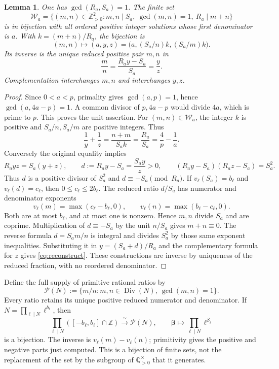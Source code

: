 \documentclass[11pt]{article}
\newtheorem{lemma}[theorem]{Lemma}
\theoremstyle{definition}\newtheorem{definition}[theorem]{Definition}
\theoremstyle{remark}\newtheorem{remark}[theorem]{Remark}
\DeclareMathOperator{\Div}{Div}
\newcommand{\Z}{\mathbb Z}\newcommand{\Q}{\mathbb Q}
\begin{document}
\begin{lemma}\label{lem:units}
One has \(\gcd(R_a,S_a)=1\).  The finite set
\[
 \mathcal W_a=
 \{(m,n)\in\Z_{>0}^2:m,n\mid S_a,\ \gcd(m,n)=1,\
                         R_a\mid m+n\}
\]
is in bijection with all ordered positive integer solutions whose first
denominator is \(a\).  With \(k=(m+n)/R_a\), the bijection is
\begin{equation}\label{eq:reconstruct}
 (m,n)\longmapsto(a,y,z)
       =\bigl(a,(S_a/n)k,(S_a/m)k\bigr).
\end{equation}
Its inverse is the unique reduced positive pair \(m,n\) in
\[
 \frac mn=\frac{R_a y-S_a}{S_a}=\frac yz .
\]
Complementation interchanges \(m,n\) and interchanges \(y,z\).
\end{lemma}
\begin{proof}
Since \(0<a<p\), primality gives \(\gcd(a,p)=1\), hence
\(\gcd(a,4a-p)=1\).  A common divisor of \(p,4a-p\) would divide
\(4a\), which is prime to \(p\).  This proves the unit assertion.
For \((m,n)\in\mathcal W_a\), the integer \(k\) is positive and
\(S_a/n,S_a/m\) are positive integers.  Thus
\[
 \frac1y+\frac1z=\frac{n+m}{S_a k}=\frac{R_a}{S_a}
                   =\frac4p-\frac1a.
\]
Conversely the original equality implies
\[
 R_a yz=S_a(y+z),\qquad
 d:=R_a y-S_a=\frac{S_a y}{z}>0,\qquad
 (R_a y-S_a)(R_a z-S_a)=S_a^2.
\]
Thus \(d\) is a positive divisor of \(S_a^2\) and
\(d\equiv-S_a\pmod{R_a}\).  If \(v_\ell(S_a)=b_\ell\) and
\(v_\ell(d)=c_\ell\), then \(0\le c_\ell\le2b_\ell\).
The reduced ratio \(d/S_a\) has numerator and denominator exponents
\[
 v_\ell(m)=\max(c_\ell-b_\ell,0),\qquad
 v_\ell(n)=\max(b_\ell-c_\ell,0).
\]
Both are at most \(b_\ell\), and at most one is nonzero.  Hence \(m,n\)
divide \(S_a\) and are coprime.  Multiplication of
\(d\equiv-S_a\) by the unit \(n/S_a\) gives \(m+n\equiv0\).
The reverse formula \(d=S_a m/n\) is integral and divides \(S_a^2\)
by those same exponent inequalities.  Substituting it in
\(y=(S_a+d)/R_a\) and the complementary formula for \(z\)
gives \eqref{eq:reconstruct}.  These constructions are inverse by
uniqueness of the reduced fraction, with no reordered denominator.
\end{proof}

Define the full supply of primitive rational ratios by
\[
 \mathcal P(N):=\{m/n:m,n\in\Div(N),\ \gcd(m,n)=1\}.
\]
Every ratio retains its unique positive reduced numerator and
denominator.  If \(N=\prod_{\ell\mid N}\ell^{b_\ell}\), then
\begin{equation}\label{eq:signed-box}
 \prod_{\ell\mid N}([-b_\ell,b_\ell]\cap\Z)
 \xrightarrow{\;\sim\;}\mathcal P(N),\qquad
 \boldsymbol\beta\longmapsto\prod_{\ell\mid N}\ell^{\beta_\ell}
\end{equation}
is a bijection.  The inverse is \(v_\ell(m)-v_\ell(n)\);
primitivity gives the positive and negative parts just computed.
This is a bijection of finite sets, not the replacement of the set
by the subgroup of \(\Q_{>0}^{\times}\) that it generates.
\end{document}
